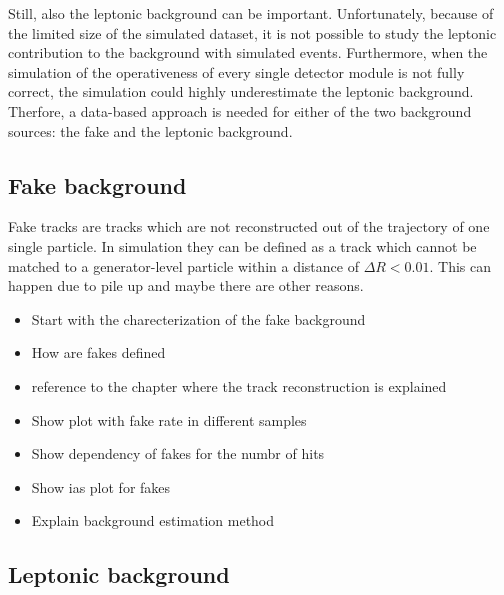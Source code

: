 Still, also the leptonic background can be important.
Unfortunately, because of the limited size of the simulated \WJets dataset, it is not possible to study the leptonic contribution to the background with simulated events.
Furthermore, when the simulation of the operativeness of every single detector module is not fully correct, the simulation could highly underestimate the leptonic background.\\

Therfore, a data-based approach is needed for either of the two background sources: the fake and the leptonic background.


\subsection{Fake background}
\label{sec:FakeBkg}

Fake tracks are tracks which are not reconstructed out of the trajectory of one single particle.
In simulation they can be defined as a track which cannot be matched to a generator-level particle within a distance of $\Delta R < 0.01$.
This can happen due to pile up and maybe there are other reasons.

\begin{itemize}
\item Start with the charecterization of the fake background
\item How are fakes defined
\item reference to the chapter where the track reconstruction is explained
\item Show plot with fake rate in different samples
\item Show dependency of fakes for the numbr of hits
\item Show ias plot for fakes
\item Explain background estimation method
\end{itemize}

\newpage

\subsection{Leptonic background}
\label{sec:LeptonicBkg}

